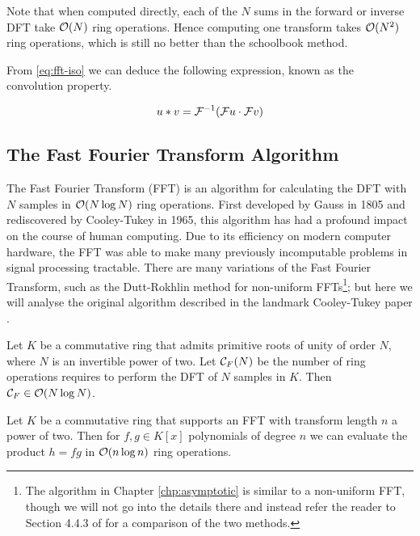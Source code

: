 Note that when computed directly, each of the $N$ sums in the forward or inverse DFT take $\mathcal O(N)$ ring operations. Hence computing one transform takes $\mathcal O(N^2)$ ring operations, which is still no better than the schoolbook method.

From \eqref{eq:fft-iso} we can deduce the following expression, known as the convolution property.

\begin{equation}
    u \ast v = \mathcal F^{-1}(\mathcal Fu \cdot \mathcal Fv)
\end{equation}


\subsection{The Fast Fourier Transform Algorithm}

The Fast Fourier Transform (FFT) is an algorithm for calculating the DFT with $N$ samples in $\mathcal O(N \log N)$ ring operations. First developed by Gauss in 1805 \cite{gauss} and rediscovered by Cooley-Tukey in 1965, this algorithm has had a profound impact on the course of human computing. Due to its efficiency on modern computer hardware, the FFT was able to make many previously incomputable problems in signal processing tractable.
There are many variations of the Fast Fourier Transform, such as the Dutt-Rokhlin method for non-uniform FFTs\cite{dutt}\footnote{The algorithm in Chapter \ref{chp:asymptotic} is similar to a non-uniform FFT, though we will not go into the details there and instead refer the reader to Section 4.4.3 of \cite{nlogn} for a comparison of the two methods.}; but here we will analyse the original algorithm described in the landmark Cooley-Tukey paper \cite{fft}.

\begin{theorem}\label{thm:fft}
    Let $K$ be a commutative ring that admits primitive roots of unity of order $N$, where $N$ is an invertible power of two. Let $\mathcal C_F(N)$ be the number of ring operations requires to perform the DFT of $N$ samples in $K$. Then $\mathcal C_F \in \mathcal O(N\log N)$.
\end{theorem}

\begin{corollary}
    Let $K$ be a commutative ring that supports an FFT with transform length $n$ a power of two. Then for $f, g \in K[x]$ polynomials of degree $n$ we can evaluate the product $h = fg$ in $\mathcal O(n\log n)$ ring operations.
\end{corollary}


